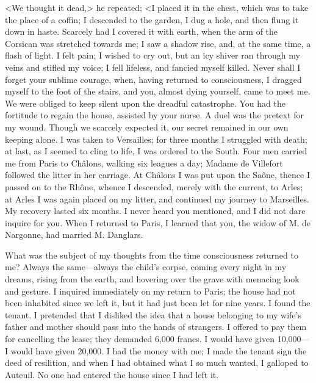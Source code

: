  <We thought it dead,> he repeated; <I placed it in the chest, which was to take the place of a coffin; I descended to the garden, I dug a hole, and then flung it down in haste. Scarcely had I covered it with earth, when the arm of the Corsican was stretched towards me; I saw a shadow rise, and, at the same time, a flash of light. I felt pain; I wished to cry out, but an icy shiver ran through my veins and stifled my voice; I fell lifeless, and fancied myself killed. Never shall I forget your sublime courage, when, having returned to consciousness, I dragged myself to the foot of the stairs, and you, almost dying yourself, came to meet me. We were obliged to keep silent upon the dreadful catastrophe. You had the fortitude to regain the house, assisted by your nurse. A duel was the pretext for my wound. Though we scarcely expected it, our secret remained in our own keeping alone. I was taken to Versailles; for three months I struggled with death; at last, as I seemed to cling to life, I was ordered to the South. Four men carried me from Paris to Châlons, walking six leagues a day; Madame de Villefort followed the litter in her carriage. At Châlons I was put upon the Saône, thence I passed on to the Rhône, whence I descended, merely with the current, to Arles; at Arles I was again placed on my litter, and continued my journey to Marseilles. My recovery lasted six months. I never heard you mentioned, and I did not dare inquire for you. When I returned to Paris, I learned that you, the widow of M. de Nargonne, had married M. Danglars. 

What was the subject of my thoughts from the time consciousness returned to me? Always the same—always the child's corpse, coming every night in my dreams, rising from the earth, and hovering over the grave with menacing look and gesture. I inquired immediately on my return to Paris; the house had not been inhabited since we left it, but it had just been let for nine years. I found the tenant. I pretended that I disliked the idea that a house belonging to my wife's father and mother should pass into the hands of strangers. I offered to pay them for cancelling the lease; they demanded 6,000 francs. I would have given 10,000—I would have given 20,000. I had the money with me; I made the tenant sign the deed of resilition, and when I had obtained what I so much wanted, I galloped to Auteuil. No one had entered the house since I had left it. 

